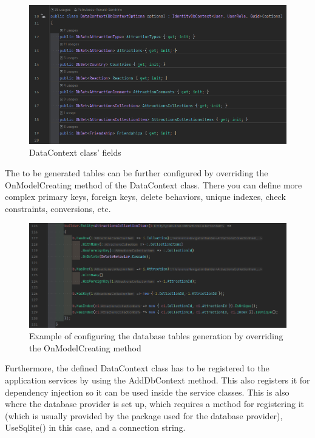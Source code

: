 \begin{figure}[!ht]
    \centering
    \includegraphics[width=1\linewidth]{4.3.1_dataContext.png}
    \caption{DataContext class' fields}
    \label{fig:enter-label}
\end{figure}

\par The to be generated tables can be further configured by overriding the OnModelCreating method of the DataContext class. There you can define more complex primary keys, foreign keys, delete behaviors, unique indexes, check constraints, conversions, etc.

\clearpage %

\begin{figure}[!ht]
    \centering
    \includegraphics[width=0.95\linewidth]{4.3.1_sample-of-OnModelCreating.png}
    \caption{Example of configuring the database tables generation by overriding the OnModelCreating method}
    \label{fig:enter-label}
\end{figure}

\par Furthermore, the defined DataContext class has to be registered to the application services by using the AddDbContext method. This also registers it for dependency injection so it can be used inside the service classes. This is also where the database provider is set up, which requires a method for registering it (which is usually provided by the package used for the database provider), UseSqlite() in this case, and a connection string.


